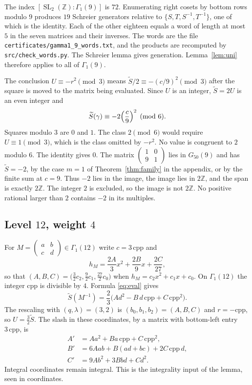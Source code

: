 \documentclass[11pt]{article}
\theoremstyle{remark}
\newcommand{\tS}{\widetilde{S}}
\newcommand{\Z}{\mathbb{Z}}
\newcommand{\SL}{\operatorname{SL}}
\begin{document}
The index \([\SL_2(\Z):\Gamma_1(9)]\) is \(72\).
Enumerating right cosets by bottom rows modulo \(9\) produces \(19\) Schreier generators relative to \(\{S,T,S^{-1},T^{-1}\}\), one of which is the identity.
Each of the other eighteen equals a word of length at most \(5\) in the seven matrices and their inverses.
The words are the file \texttt{certificates/gamma1\_9\_words.txt}, and the products are recomputed by \texttt{src/check\_words.py}.
The Schreier lemma gives generation.
Lemma~\ref{lem:uni} therefore applies to all of \(\Gamma_1(9)\).

The conclusion \(U\equiv -r^2\pmod{3}\) means \(\tS/2\equiv -(c/9)^2\pmod{3}\) after the square is moved to the matrix being evaluated.
Since \(U\) is an integer, \(\tS=2U\) is an even integer and
\[
\tS(\gamma)\equiv -2\Bigl(\frac{c}{9}\Bigr)^2\pmod{6}.
\]
Squares modulo \(3\) are \(0\) and \(1\).
The class \(2\pmod{6}\) would require \(U\equiv 1\pmod{3}\), which is the class omitted by \(-r^2\).
No value is congruent to \(2\) modulo \(6\).
The identity gives \(0\).
The matrix \(\begin{pmatrix}1&0\\9&1\end{pmatrix}\) lies in \(G_{50}(9)\) and has \(\tS=-2\), by the case \(m=1\) of Theorem~\ref{thm:family} in the appendix, or by the finite sum at \(c=9\).
Thus \(-2\) lies in the image, the image lies in \(2\Z\), and the span is exactly \(2\Z\).
The integer \(2\) is excluded, so the image is not \(2\Z\).
No positive rational larger than \(2\) contains \(-2\) in its multiples.

\subsection{Level \(12\), weight \(4\)}
\label{sec:12}

For \(M=\begin{pmatrix}a&b\\c&d\end{pmatrix}\in\Gamma_1(12)\) write \(c=3\,\mathrm{cpp}\) and
\[
h_M=\frac{2A}{3}x^2+\frac{2B}{9}x+\frac{2C}{27},
\]
so that \((A,B,C)=\bigl(\tfrac32 c_2,\tfrac92 c_1,\tfrac{27}{2}c_0\bigr)\) when \(h_M=c_2x^2+c_1x+c_0\).
On \(\Gamma_1(12)\) the integer \(\mathrm{cpp}\) is divisible by \(4\).
Formula \eqref{eq:eval} gives
\[
\tS(M^{-1})=\frac23\bigl(Ad^2-B\,d\,\mathrm{cpp}+C\,\mathrm{cpp}^2\bigr).
\]
The rescaling with \((q,\lambda)=(3,2)\) is \((b_0,b_1,b_2)=(A,B,C)\) and \(r=-\mathrm{cpp}\), so \(U=\tfrac32\tS\).
The slash in these coordinates, by a matrix with bottom-left entry \(3\,\mathrm{cpp}\), is
\begin{align*}
A'&=Aa^2+Ba\,\mathrm{cpp}+C\,\mathrm{cpp}^2,\\
B'&=6Aab+B(ad+bc)+2C\,\mathrm{cpp}\,d,\\
C'&=9Ab^2+3Bbd+Cd^2.
\end{align*}
Integral coordinates remain integral.
This is the integrality input of the lemma, seen in coordinates.
\end{document}
